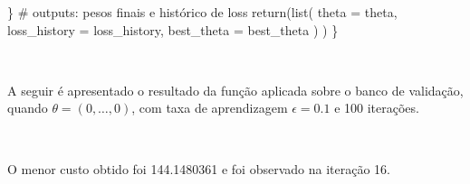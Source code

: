 \documentclass[
  a4paperpaper,
]{article}
\newenvironment{Shaded}{\begin{snugshade}}{\end{snugshade}}
\newcommand{\AttributeTok}[1]{\textcolor[rgb]{0.40,0.45,0.13}{#1}}
\newcommand{\CommentTok}[1]{\textcolor[rgb]{0.37,0.37,0.37}{#1}}
\newcommand{\ConstantTok}[1]{\textcolor[rgb]{0.56,0.35,0.01}{#1}}
\newcommand{\DecValTok}[1]{\textcolor[rgb]{0.68,0.00,0.00}{#1}}
\newcommand{\FloatTok}[1]{\textcolor[rgb]{0.68,0.00,0.00}{#1}}
\newcommand{\FunctionTok}[1]{\textcolor[rgb]{0.28,0.35,0.67}{#1}}
\newcommand{\NormalTok}[1]{\textcolor[rgb]{0.00,0.23,0.31}{#1}}
\newcommand{\OtherTok}[1]{\textcolor[rgb]{0.00,0.23,0.31}{#1}}
\newcommand{\SpecialCharTok}[1]{\textcolor[rgb]{0.37,0.37,0.37}{#1}}
\begin{document}
\begin{Shaded}
\begin{Highlighting}[]
\NormalTok{  \} }
  \CommentTok{\# outputs: pesos finais e histórico de loss}
  \FunctionTok{return}\NormalTok{(}\FunctionTok{list}\NormalTok{(}
    \AttributeTok{theta =}\NormalTok{ theta,}
    \AttributeTok{loss\_history =}\NormalTok{ loss\_history,}
    \AttributeTok{best\_theta =}\NormalTok{ best\_theta}
\NormalTok{    )}
\NormalTok{  )}
\NormalTok{\}}
\end{Highlighting}
\end{Shaded}

~

A seguir é apresentado o resultado da função aplicada sobre o banco de
validação, quando \(\theta = (0, \dots , 0)\), com taxa de aprendizagem
\(\epsilon = 0.1\) e 100 iterações.

\begin{Shaded}
\end{Shaded}

~

O menor custo obtido foi 144.1480361 e foi observado na iteração 16.
\end{document}
